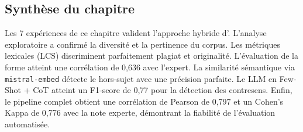 \subsection*{Synthèse du chapitre}

Les 7 expériences de ce chapitre valident l'approche hybride d'\AZIZA. L'analyse exploratoire a confirmé la diversité et la pertinence du corpus. Les métriques lexicales (LCS) discriminent parfaitement plagiat et originalité. L'évaluation de la forme atteint une corrélation de 0,636 avec l'expert. La similarité sémantique via \texttt{mistral-embed} détecte le hors-sujet avec une précision parfaite. Le LLM en Few-Shot + CoT atteint un F1-score de 0,77 pour la détection des contresens. Enfin, le pipeline complet obtient une corrélation de Pearson de 0,797 et un Cohen's Kappa de 0,776 avec la note experte, démontrant la fiabilité de l'évaluation automatisée.

